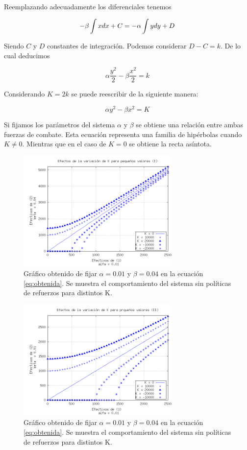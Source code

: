 \documentclass{sig-alternate}
\begin{document}
Reemplazando adecuadamente los diferenciales tenemos 

\begin{equation}
-\beta\intop x dx + C =-\alpha\int y dy + D\end{equation}


Siendo $C$ y $D$ constantes de integración. Podemos considerar $D - C = k$. De lo cual deducimos

\begin{equation}
\alpha\frac{y^{2}}{2}-\beta\frac{x^{2}}{2}=k\end{equation}


Considerando $K=2k$ se puede reescribir de la siguiente manera:

\begin{equation}
\alpha y^{2}-\beta x^{2}=K\label{eq:obtenida}\end{equation}

Si fijamos los parámetros del sistema $\alpha$ y $\beta$ se obtiene una relación entre ambas fuerzas de combate. Esta ecuación representa una familia de hip\'erbolas cuando $K \ne 0$. Mientras que en el caso de $K = 0$ se obtiene la recta asíntota.
\begin{figure}[h]
\begin{center}
\includegraphics[width=8cm]{power_areas_1}
\caption{\label{fig:powerarea1} Gr\'afico obtenido de fijar $\alpha = 0.01$ y $\beta = 0.04$ en la ecuación \ref{eq:obtenida}. Se muestra el comportamiento del sistema sin políticas de refuerzos para distintos K.}
\end{center}
\end{figure}
\begin{figure}[h]
\begin{center}
\includegraphics[width=8cm]{power_areas_2}
\caption{\label{fig:powerarea2} Gr\'afico obtenido de fijar $\alpha = 0.01$ y $\beta = 0.04$ en la ecuación \ref{eq:obtenida}. Se muestra el comportamiento del sistema sin políticas de refuerzos para distintos K.}
\end{center}
\end{figure}
\end{document}
